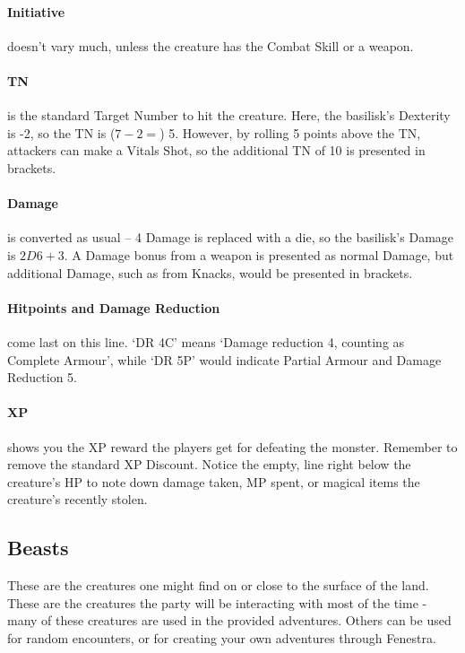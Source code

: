 \paragraph{Initiative} doesn't vary much, unless the creature has the Combat Skill or a weapon.

\paragraph{TN} is the standard Target Number to hit the creature.  Here, the basilisk's Dexterity is -2, so the TN is ($7 - 2 =$) 5.  However, by rolling 5 points above the TN, attackers can make a Vitals Shot, so the additional TN of 10 is presented in brackets.

\paragraph{Damage} is converted as usual -- 4 Damage is replaced with a die, so the basilisk's Damage is $2D6+3$.  A Damage bonus from a weapon is presented as normal Damage, but additional Damage, such as from Knacks, would be presented in brackets.

\paragraph{Hitpoints and Damage Reduction} come last on this line.  `DR 4C' means `Damage reduction 4, counting as Complete Armour', while `DR 5P' would indicate Partial Armour and Damage Reduction 5.

\paragraph{XP} shows you the XP reward the players get for defeating the monster.  Remember to remove the standard XP Discount.  Notice the empty, line right below the creature's HP to note down damage taken, MP spent, or magical items the creature's recently stolen.


\subsection{Beasts}

These are the creatures one might find on or close to the surface of the land.  These are the creatures the party will be interacting with most of the time - many of these creatures are used in the provided adventures.  Others can be used for random encounters, or for creating your own adventures through Fenestra.


